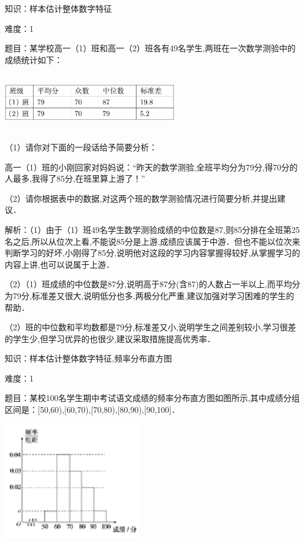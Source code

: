 \documentclass{article} %
\begin{document}
知识：样本估计整体数字特征

难度：1

题目：某学校高一（1）班和高一（2）班各有49名学生,两班在一次数学测验中的成绩统计如下：

\includegraphics*[width=3in, height=1in, keepaspectratio=false]{image120}

（1）请你对下面的一段话给予简要分析：

高一（1）班的小刚回家对妈妈说：``昨天的数学测验,全班平均分为79分,得70分的人最多,我得了85分,在班里算上游了！''

（2）请你根据表中的数据,对这两个班的数学测验情况进行简要分析,并提出建议．

解析：（1）由于（1）班49名学生数学测验成绩的中位数是87,则85分排在全班第25名之后,所以从位次上看,不能说85分是上游,成绩应该属于中游．但也不能以位次来判断学习的好坏,小刚得了85分,说明他对这段的学习内容掌握得较好,从掌握学习的内容上讲,也可以说属于上游．

（2）（1）班成绩的中位数是87分,说明高于87分(含87)的人数占一半以上,而平均分为79分,标准差又很大,说明低分也多,两极分化严重,建议加强对学习困难的学生的帮助．

（2）班的中位数和平均数都是79分,标准差又小,说明学生之间差别较小,学习很差的学生少,但学习优异的也很少,建议采取措施提高优秀率．



知识：样本估计整体数字特征,频率分布直方图

难度：1

题目：某校100名学生期中考试语文成绩的频率分布直方图如图所示,其中成绩分组区间是：[50,60),[60,70),[70,80),[80,90),[90,100]．

\includegraphics*[width=2.36in, height=2.00in, keepaspectratio=false]{image95}
\end{document}
